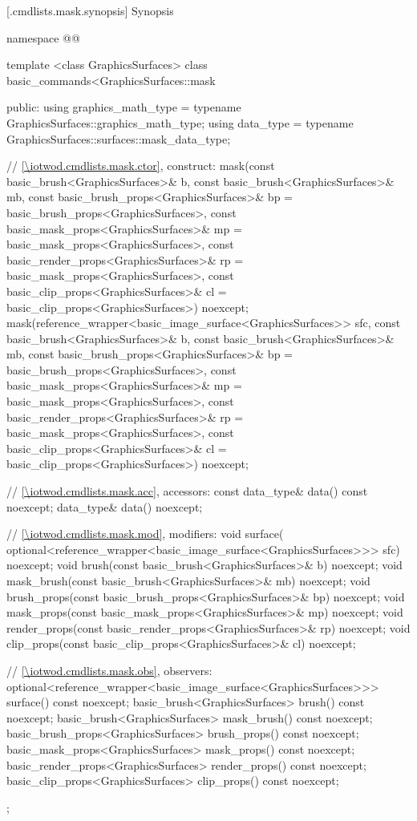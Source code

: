  [\iotwod.cmdlists.mask.synopsis] {Synopsis}
\begin{codeblock}
namespace @\fullnamespace{}@ {
  template <class GraphicsSurfaces>
  class basic_commands<GraphicsSurfaces::mask {
  public:
    using graphics_math_type = typename GraphicsSurfaces::graphics_math_type;
    using data_type = typename GraphicsSurfaces::surfaces::mask_data_type;

    // \ref{\iotwod.cmdlists.mask.ctor}, construct:
    mask(const basic_brush<GraphicsSurfaces>& b,
      const basic_brush<GraphicsSurfaces>& mb,
      const basic_brush_props<GraphicsSurfaces>& bp = 
      basic_brush_props<GraphicsSurfaces>{},
      const basic_mask_props<GraphicsSurfaces>& mp = 
      basic_mask_props<GraphicsSurfaces>{},
      const basic_render_props<GraphicsSurfaces>& rp = 
      basic_mask_props<GraphicsSurfaces>{},
      const basic_clip_props<GraphicsSurfaces>& cl = 
      basic_clip_props<GraphicsSurfaces>{}) noexcept;
    mask(reference_wrapper<basic_image_surface<GraphicsSurfaces>> sfc,
      const basic_brush<GraphicsSurfaces>& b,
      const basic_brush<GraphicsSurfaces>& mb,
      const basic_brush_props<GraphicsSurfaces>& bp = 
      basic_brush_props<GraphicsSurfaces>{},
      const basic_mask_props<GraphicsSurfaces>& mp = 
      basic_mask_props<GraphicsSurfaces>{},
      const basic_render_props<GraphicsSurfaces>& rp = 
      basic_mask_props<GraphicsSurfaces>{},
      const basic_clip_props<GraphicsSurfaces>& cl = 
      basic_clip_props<GraphicsSurfaces>{}) noexcept;
    
    // \ref{\iotwod.cmdlists.mask.acc}, accessors:
    const data_type& data() const noexcept;
    data_type& data() noexcept;

    // \ref{\iotwod.cmdlists.mask.mod}, modifiers:
    void surface(
      optional<reference_wrapper<basic_image_surface<GraphicsSurfaces>>> sfc) 
      noexcept;
    void brush(const basic_brush<GraphicsSurfaces>& b) noexcept;
    void mask_brush(const basic_brush<GraphicsSurfaces>& mb) noexcept;
    void brush_props(const basic_brush_props<GraphicsSurfaces>& bp) noexcept;
    void mask_props(const basic_mask_props<GraphicsSurfaces>& mp) noexcept;
    void render_props(const basic_render_props<GraphicsSurfaces>& rp) noexcept;
    void clip_props(const basic_clip_props<GraphicsSurfaces>& cl) noexcept;

    // \ref{\iotwod.cmdlists.mask.obs}, observers:
    optional<reference_wrapper<basic_image_surface<GraphicsSurfaces>>> 
      surface() const noexcept;
    basic_brush<GraphicsSurfaces> brush() const noexcept;
    basic_brush<GraphicsSurfaces> mask_brush() const noexcept;
    basic_brush_props<GraphicsSurfaces> brush_props() const noexcept;
    basic_mask_props<GraphicsSurfaces> mask_props() const noexcept;
    basic_render_props<GraphicsSurfaces> render_props() const noexcept;
    basic_clip_props<GraphicsSurfaces> clip_props() const noexcept;
  };

}
\end{codeblock}
